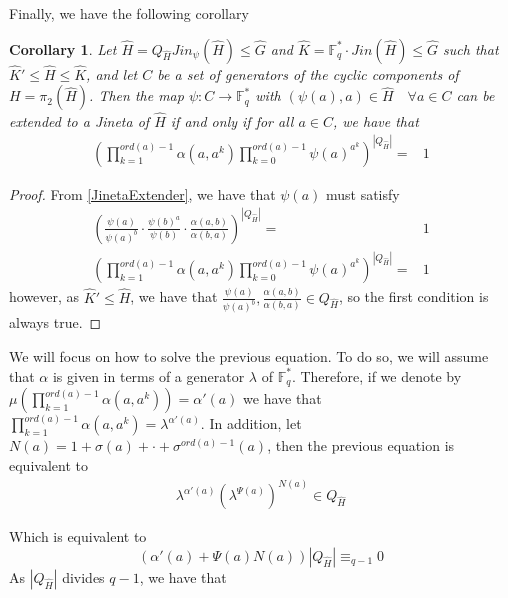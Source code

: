 \documentclass{article}
\newtheorem{corollary}[theorem]{Corollary}
\begin{document}
Finally, we have the following corollary
\begin{corollary}
        Let $\hat{H}=Q_{\hat{H}} Jin_\psi(\hat{H}) \leq \hat{G}$ and $\hat{K}= \mathbb{F}_q^* \cdot Jin(\hat{H}) \leq \hat{G}$ such that $\hat{K}'\leq \hat{H} \leq \hat{K}$, and let $C$ be a set of generators of the cyclic components of $H=\pi_2(\hat{H})$. Then the map $\psi: C \longrightarrow \mathbb{F}_q^*$ with $(\psi(a),a)\in \hat{H}   \quad \forall a\in C$ can be extended to a Jineta of $\hat{H}$ if and only if for all $a\in C$, we have that
    \begin{align} 
       \left(\prod_{k=1}^{ord(a)-1}\alpha(a,a^k) \prod_{k=0}^{ord(a)-1} \psi(a)^{a^k}\right) ^ { |Q_{\hat{H}}|} =&  1 
    \end{align}
\end{corollary}
\begin{proof}
    From \ref{JinetaExtender}, we have that $\psi(a)$ must satisfy
        \begin{align} 
        \left(\frac{\psi(a)}{\psi(a)^b} \cdot \frac{\psi(b)^a}{\psi(b)} \cdot \frac{\alpha(a,b)}{\alpha(b,a)} \right) ^ { |Q_{\hat{H}}|} =& 1 \\
       \left(\prod_{k=1}^{ord(a)-1}\alpha(a,a^k) \prod_{k=0}^{ord(a)-1} \psi(a)^{a^k}\right) ^ { |Q_{\hat{H}}|} =&  1 
    \end{align}
    however, as $\hat{K}'\leq \hat{H}$, we have that $\frac{\psi(a)}{\psi(a)^b} ,\frac{\alpha(a,b)}{\alpha(b,a)} \in Q_{\hat{H}} $, so the first condition is always true.
\end{proof}

We will focus on how to solve the previous equation. To do so, we will assume that $\alpha$ is given in terms of a generator $\lambda$ of $\mathbb{F}_q^*$. Therefore, if we denote by $\mu\left(\prod_{k=1}^{ord(a)-1}\alpha(a,a^k) \right) = \alpha'(a)$ we have that $\prod_{k=1}^{ord(a)-1}\alpha(a,a^k) = \lambda^{\alpha'(a)}$. In addition, let $N(a) = 1 + \sigma(a) + \cdot + \sigma^{ord(a)-1}(a)$, then the previous equation is equivalent to
\begin{align*}
    \lambda^{\alpha'(a)} \left(\lambda^{\Psi(a)}\right) ^{N(a)} \in Q_{\hat{H}}
\end{align*}

Which is equivalent to
\begin{equation*}
   (\alpha'(a) + \Psi(a)N(a)) |Q_{\hat{H}}| \equiv_{q-1} 0 
\end{equation*}
As $|Q_{\hat{H}}| $ divides $q-1$, we have that 
\end{document}
